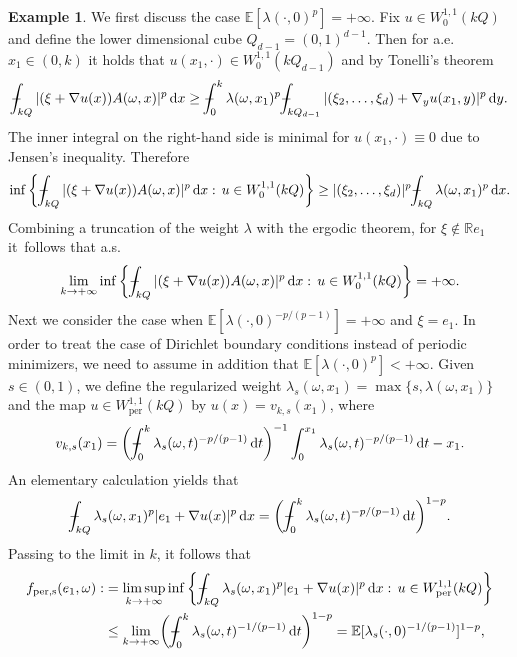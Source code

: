 \documentclass[JEP,XML,SOM,Unicode,published]{cedram}
\theoremstyle{definition}
\newtheorem{example}[theorem]{Example}
\def\Xint#1{\mathchoice
{\XXint\displaystyle\textstyle{#1}}%
{\XXint\textstyle\scriptstyle{#1}}%
{\XXint\scriptstyle\scriptscriptstyle{#1}}%
{\XXint\scriptscriptstyle\scriptscriptstyle{#1}}%
\!\int}
\def\XXint#1#2#3{{\setbox0=\hbox{$#1{#2#3}{\int}$ }
\vcenter{\hbox{$#2#3$ }}\kern-.57\wd0}}
\def\dashint{\Xint-}
\let\w\omega
\newcommand{\dx}{\,\mathrm{d}x}
\newcommand{\dy}{\,\mathrm{d}y}
\newcommand{\R}{\mathbb{R}}
\begin{document}
\begin{example}
We first discuss the case $\mathbb{E}[\lambda(\cdot,0)^p]=+\infty$. Fix $u\in W^{1,1}_0(kQ)$ and define the lower dimensional cube $Q_{d-1}=(0,1)^{d-1}$. Then for a.e.\ $x_1\in (0,k)$ it holds that $u(x_1,\cdot)\in W_0^{1,1}(kQ_{d-1})$ and by Tonelli's theorem
\begin{equation*}
\dashint_{kQ}|(\xi+\nabla u(x))A(\w,x)|^p\dx\geq\dashint_0^k\lambda(\w,x_1)^p \dashint_{kQ_{d-1}}|(\xi_2,\ldots,\xi_d)+\nabla_yu(x_1,y)|^p\dy.
\end{equation*}
The inner integral on the right-hand side is minimal for $u(x_1,\cdot)\equiv 0$ due to Jensen's inequality. Therefore
\begin{equation*}
\inf\left\{\dashint_{kQ}|(\xi+\nabla u(x))A(\w,x)|^p\dx:\,u\in W^{1,1}_0(kQ)\right\}\geq |(\xi_2,\ldots,\xi_d)|^p\dashint_{kQ}\lambda(\w,x_1)^p\dx.
\end{equation*}
Combining a truncation of the weight $\lambda$ with the ergodic theorem, for $\xi\notin\R e_1$ it~follows that a.s.
\begin{equation}\label{eq:toinfinity}
\lim_{k\to +\infty}\inf\left\{\dashint_{kQ}|(\xi+\nabla u(x))A(\w,x)|^p\dx:\,u\in W^{1,1}_0(kQ)\right\}=+\infty.
\end{equation}
Next we consider the case when $\mathbb{E}[\lambda(\cdot,0)^{-p/(p-1)}]=+\infty$ and $\xi=e_1$. In order to treat the case of Dirichlet boundary conditions instead of periodic minimizers, we need to assume in addition that $\mathbb{E}[\lambda(\cdot,0)^p]<+\infty$. Given $s\in (0,1)$, we define the regularized weight $\lambda_s(\w,x_1)=\max\{s,\lambda(\w,x_1)\}$ and the map $u\in W^{1,1}_\mathrm{per}(kQ)$ by $u(x)=v_{k,s}(x_1)$, where
\begin{equation*}
v_{k,s}(x_1)=\biggl(\dashint_0^k\lambda_s(\w,t)^{-p/(p-1)}\,\mathrm{d}t\biggr)^{-1}\int_0^{x_1}\lambda_s(\w,t)^{-p/(p-1)}\,\mathrm{d}t-x_1.
\end{equation*}
An elementary calculation yields that
\begin{align*}
\dashint_{kQ}\lambda_s(\w,x_1)^p|e_1+\nabla u(x)|^p\dx= \biggl(\dashint_0^k\lambda_s(\w,t)^{-p/(p-1)}\,\mathrm{d}t\biggr)^{1-p}.
\end{align*}
Passing to the limit in $k$, it follows that
\begin{align*}
f_\mathrm{per,s}(e_1,\w):&=\limsup_{k\to +\infty}\inf\left\{\dashint_{kQ}\lambda_{s}(\w,x_1)^p|e_1+\nabla u(x)|^p\dx:\,u\in W^{1,1}_\mathrm{per}(kQ)\right\}
\\
&\leq \lim_{k\to +\infty}\biggl(\dashint_0^k\lambda_s(\w,t)^{-1/(p-1)}\,\mathrm{d}t\biggr)^{1-p}=\mathbb{E}[\lambda_s(\cdot,0)^{-1/(p-1)}]^{1-p},

\end{align*}
\end{example}
\end{document}
